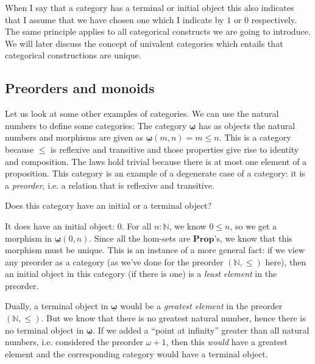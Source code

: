\documentclass{article}
\newcommand{\Prop}{\mathbf{Prop}}
\newcommand{\cat}[1]{\underline{\mathbf{#1}}}
\newcommand{\homC}[3]{\cat{#1}(#2,#3)}
\newcommand{\Nat}{\mathbb{N}}
\begin{document}
When I say that a category has a terminal or initial object this also indicates that I assume that we have chosen one which I indicate by $1$ or $0$ respectively. The same principle applies to all categorical constructs we are going to introduce. We will later discuss the concept of univalent categories which entails that categorical constructions are unique.

\subsection{Preorders and monoids}
\label{sec:preorders-mnoids}

Let us look at some other examples of categories. We can use the natural numbers to define some categories: The category $\cat{\omega}$ has as objects the natural numbers and morphisms are given as $\homC{\omega}{m}{n} = m \leq n$. This is a category because $\leq$ is reflexive and transitive and those properties give rise to identity and composition. The laws hold trivial because there is at most one element of a proposition. This category is an example of a degenerate case of a category: it is a \emph{preorder}, i.e. a relation that is reflexive and transitive. 

\begin{Exercise}
  Does this category have an initial or a terminal object? 
\end{Exercise}
\begin{Answer}
  It does have an initial object: 0. For all $n\colon\Nat$, we know $0\leq n$, so we get a morphism in $\homC{\omega}{0}{n}$. Since all the hom-sets are $\Prop$'s, we know that this morphism must be unique. This is an instance of a more general fact: if we view any preorder as a category (as we've done for the preorder $(\Nat,\leq)$ here), then an initial object in this category (if there is one) is a \emph{least element} in the preorder.

  Dually, a terminal object in $\cat{\omega}$ would be a \emph{greatest element} in the preorder $(\Nat,\leq)$. But we know that there is no greatest natural number, hence there is no terminal object in $\cat{\omega}$. If we added a ``point at infinity'' greater than all natural numbers, i.e. considered the preorder $\omega+1$, then this \emph{would} have a greatest element and the corresponding category would have a terminal object. 
\end{Answer}

\end{document}
